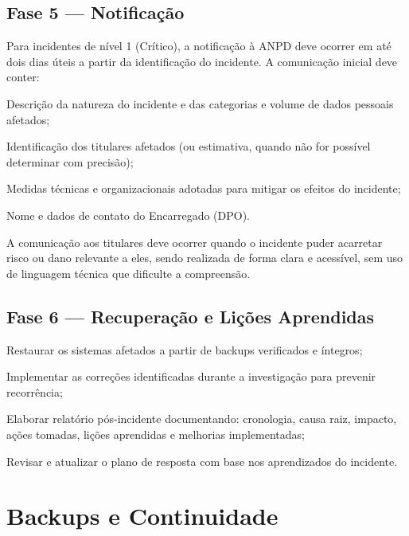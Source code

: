 \subsection{Fase 5 — Notificação}
\label{subsec:notificacao}

Para incidentes de nível 1 (Crítico), a notificação à ANPD deve ocorrer em até dois dias úteis a partir da identificação do incidente. A comunicação inicial deve conter:

\begin{alineas}
    \item Descrição da natureza do incidente e das categorias e volume de dados pessoais afetados;
    \item Identificação dos titulares afetados (ou estimativa, quando não for possível determinar com precisão);
    \item Medidas técnicas e organizacionais adotadas para mitigar os efeitos do incidente;
    \item Nome e dados de contato do Encarregado (DPO).
\end{alineas}

A comunicação aos titulares deve ocorrer quando o incidente puder acarretar risco ou dano relevante a eles, sendo realizada de forma clara e acessível, sem uso de linguagem técnica que dificulte a compreensão.

\subsection{Fase 6 — Recuperação e Lições Aprendidas}
\label{subsec:recuperacao}

\begin{alineas}
    \item Restaurar os sistemas afetados a partir de backups verificados e íntegros;
    \item Implementar as correções identificadas durante a investigação para prevenir recorrência;
    \item Elaborar relatório pós-incidente documentando: cronologia, causa raiz, impacto, ações tomadas, lições aprendidas e melhorias implementadas;
    \item Revisar e atualizar o plano de resposta com base nos aprendizados do incidente.
\end{alineas}

\section{Backups e Continuidade}
\label{sec:backups}

